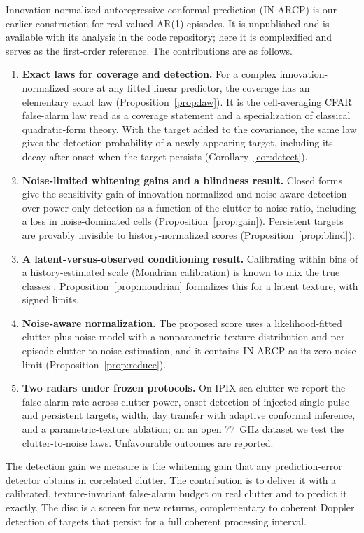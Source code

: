 \documentclass[journal]{IEEEtran}
\begin{document}
Innovation-normalized autoregressive conformal prediction (IN-ARCP) is our earlier construction for real-valued AR(1) episodes. It is unpublished and is available with its analysis in the code repository; here it is complexified and serves as the first-order reference. The contributions are as follows.
\begin{enumerate}[leftmargin=*,itemsep=2pt]
\item \textbf{Exact laws for coverage and detection.} For a complex innovation-normalized score at any fitted linear predictor, the coverage has an elementary exact law (Proposition~\ref{prop:law}). It is the cell-averaging CFAR false-alarm law read as a coverage statement and a specialization of classical quadratic-form theory. With the target added to the covariance, the same law gives the detection probability of a newly appearing target, including its decay after onset when the target persists (Corollary~\ref{cor:detect}).
\item \textbf{Noise-limited whitening gains and a blindness result.} Closed forms give the sensitivity gain of innovation-normalized and noise-aware detection over power-only detection as a function of the clutter-to-noise ratio, including a loss in noise-dominated cells (Proposition~\ref{prop:gain}). Persistent targets are provably invisible to history-normalized scores (Proposition~\ref{prop:blind}).
\item \textbf{A latent-versus-observed conditioning result.} Calibrating within bins of a history-estimated scale (Mondrian calibration) is known to mix the true classes \cite{dewolf2025}. Proposition~\ref{prop:mondrian} formalizes this for a latent texture, with signed limits.
\item \textbf{Noise-aware normalization.} The proposed score uses a likelihood-fitted clutter-plus-noise model with a nonparametric texture distribution and per-episode clutter-to-noise estimation, and it contains IN-ARCP as its zero-noise limit (Proposition~\ref{prop:reduce}).
\item \textbf{Two radars under frozen protocols.} On IPIX sea clutter we report the false-alarm rate across clutter power, onset detection of injected single-pulse and persistent targets, width, day transfer with adaptive conformal inference, and a parametric-texture ablation; on an open 77~GHz dataset we test the clutter-to-noise laws. Unfavourable outcomes are reported.
\end{enumerate}
The detection gain we measure is the whitening gain that any prediction-error detector obtains in correlated clutter. The contribution is to deliver it with a calibrated, texture-invariant false-alarm budget on real clutter and to predict it exactly. The disc is a screen for new returns, complementary to coherent Doppler detection of targets that persist for a full coherent processing interval.
\end{document}
